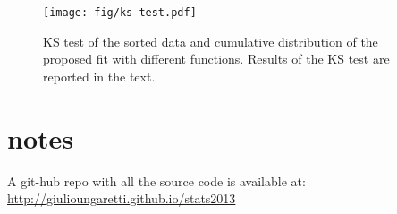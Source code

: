 \documentclass[twocolumn]{article}
\begin{document}
\begin{figure}[h!]
	\begin{center}
		\texttt{[image: fig/ks-test.pdf]}
	\end{center}
	\caption{KS test of the sorted data and cumulative distribution of the proposed fit with different functions. Results  of the KS test are reported in the text.}
	\label{fig:test}
\end{figure}


\subsection{}


\section{notes}
A git-hub repo with all the source code is available at:
\url{http://giulioungaretti.github.io/stats2013}
\end{document}
